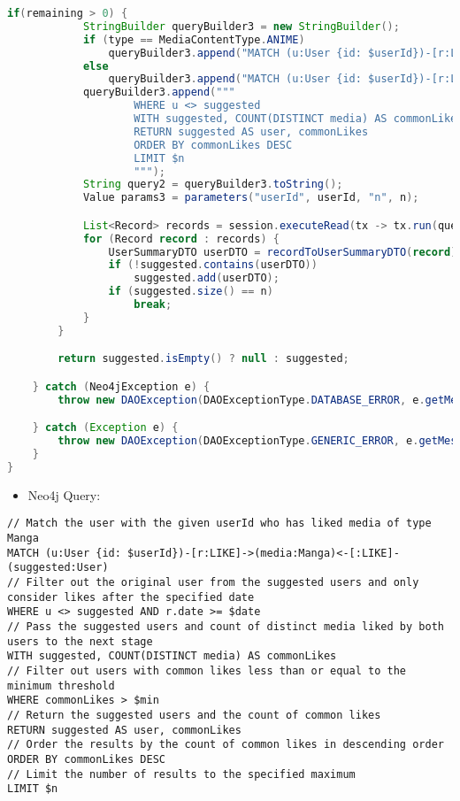 \begin{mdframed}[style=customstyle]
\begin{lstlisting}[language=java]
        if(remaining > 0) {
            StringBuilder queryBuilder3 = new StringBuilder();
            if (type == MediaContentType.ANIME)
                queryBuilder3.append("MATCH (u:User {id: $userId})-[r:LIKE]->(media:Anime)<-[:LIKE]-(suggested:User) ");
            else
                queryBuilder3.append("MATCH (u:User {id: $userId})-[r:LIKE]->(media:Manga)<-[:LIKE]-(suggested:User) ");
            queryBuilder3.append("""
                    WHERE u <> suggested
                    WITH suggested, COUNT(DISTINCT media) AS commonLikes
                    RETURN suggested AS user, commonLikes
                    ORDER BY commonLikes DESC
                    LIMIT $n
                    """);
            String query2 = queryBuilder3.toString();
            Value params3 = parameters("userId", userId, "n", n);

            List<Record> records = session.executeRead(tx -> tx.run(query2, params3).list());
            for (Record record : records) {
                UserSummaryDTO userDTO = recordToUserSummaryDTO(record);
                if (!suggested.contains(userDTO))
                    suggested.add(userDTO);
                if (suggested.size() == n)
                    break;
            }
        }

        return suggested.isEmpty() ? null : suggested;

    } catch (Neo4jException e) {
        throw new DAOException(DAOExceptionType.DATABASE_ERROR, e.getMessage());

    } catch (Exception e) {
        throw new DAOException(DAOExceptionType.GENERIC_ERROR, e.getMessage());
    }
}
\end{lstlisting}
\end{mdframed}
    
\begin{itemize}
    \item Neo4j Query:
\end{itemize}

\begin{mdframed}[style=customstyle]
\begin{lstlisting}[language=Cypher]
// Match the user with the given userId who has liked media of type Manga
MATCH (u:User {id: $userId})-[r:LIKE]->(media:Manga)<-[:LIKE]-(suggested:User) 
// Filter out the original user from the suggested users and only consider likes after the specified date
WHERE u <> suggested AND r.date >= $date
// Pass the suggested users and count of distinct media liked by both users to the next stage
WITH suggested, COUNT(DISTINCT media) AS commonLikes
// Filter out users with common likes less than or equal to the minimum threshold
WHERE commonLikes > $min
// Return the suggested users and the count of common likes
RETURN suggested AS user, commonLikes
// Order the results by the count of common likes in descending order
ORDER BY commonLikes DESC
// Limit the number of results to the specified maximum
LIMIT $n\end{lstlisting}
\end{mdframed}

